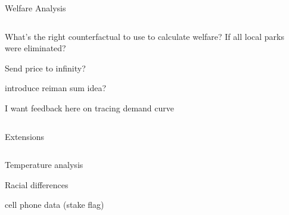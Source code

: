 \documentclass[notes,11pt, aspectratio=169]{beamer}
\newenvironment{wideitemize}{\itemize\addtolength{\itemsep}{10pt}}{\enditemize}
\begin{document}
\begin{frame}{Welfare Analysis }

\begin{columns}[T] %
\begin{column}{.9\textwidth}
  \begin{wideitemize}
  \item What's the right counterfactual to use to calculate welfare? If all local parks were eliminated? 
  \item Send price to infinity? 
  \item introduce reiman sum idea?
  \item I want feedback here on tracing demand curve
  

  \end{wideitemize}
\end{column}%
\hfill%
\begin{column}{.38\textwidth}
  \makebox[\linewidth][c]{
    \resizebox{\linewidth}{!}{
    }
  }
\end{column}%
\end{columns}
\end{frame}


\begin{frame}{Extensions}

\begin{columns}[T] %
\begin{column}{.9\textwidth}
  \begin{wideitemize}
  \item Temperature analysis 
  \item Racial differences 
  \item cell phone data (stake flag) 
  

  \end{wideitemize}
\end{column}%
\hfill%
\begin{column}{.38\textwidth}
  \makebox[\linewidth][c]{
    \resizebox{\linewidth}{!}{
    }
  }
\end{column}%
\end{columns}
\end{frame}
\end{document}

